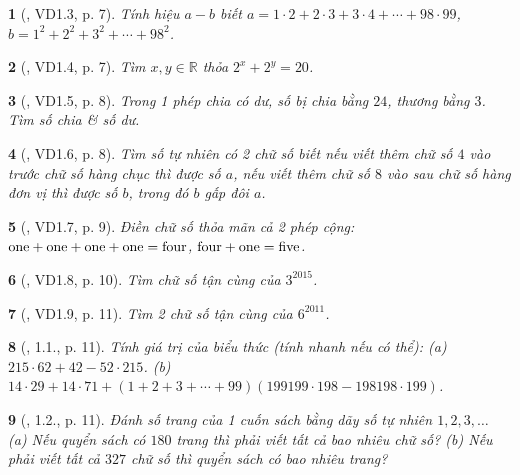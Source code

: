 \documentclass{article}
\newtheorem{baitoan}{}
\begin{document}
\begin{baitoan}[\cite{TLCT_THCS_Toan_6_so_hoc}, VD1.3, p. 7]
	Tính hiệu $a - b$ biết $a = 1\cdot2 + 2\cdot3 + 3\cdot4 + \cdots + 98\cdot99$, $b = 1^2 + 2^2 + 3^2 + \cdots + 98^2$.
\end{baitoan}

\begin{baitoan}[\cite{TLCT_THCS_Toan_6_so_hoc}, VD1.4, p. 7]
	Tìm $x,y\in\mathbb{R}$ thỏa $2^x + 2^y = 20$.
\end{baitoan}

\begin{baitoan}[\cite{TLCT_THCS_Toan_6_so_hoc}, VD1.5, p. 8]
	Trong 1 phép chia có dư, số bị chia bằng $24$, thương bằng $3$. Tìm số chia \& số dư.
\end{baitoan}

\begin{baitoan}[\cite{TLCT_THCS_Toan_6_so_hoc}, VD1.6, p. 8]
	Tìm số tự nhiên có 2 chữ số biết nếu viết thêm chữ số $4$ vào trước chữ số hàng chục thì được số $a$, nếu viết thêm chữ số $8$ vào sau chữ số hàng đơn vị thì được số $b$, trong đó $b$ gấp đôi $a$.
\end{baitoan}

\begin{baitoan}[\cite{TLCT_THCS_Toan_6_so_hoc}, VD1.7, p. 9]
	Điền chữ số thỏa mãn cả 2 phép cộng: $\rm one + one + one + one = four$, $\rm four + one = five$.
\end{baitoan}

\begin{baitoan}[\cite{TLCT_THCS_Toan_6_so_hoc}, VD1.8, p. 10]
	Tìm chữ số tận cùng của $3^{2015}$.
\end{baitoan}

\begin{baitoan}[\cite{TLCT_THCS_Toan_6_so_hoc}, VD1.9, p. 11]
	Tìm 2 chữ số tận cùng của $6^{2011}$.
\end{baitoan}

\begin{baitoan}[\cite{TLCT_THCS_Toan_6_so_hoc}, 1.1., p. 11]
	Tính giá trị của biểu thức (tính nhanh nếu có thể): (a) $215\cdot62 + 42 - 52\cdot215$. (b) $14\cdot29 + 14\cdot71 + (1 + 2 + 3 + \cdots + 99)(199199\cdot198 - 198198\cdot199)$.
\end{baitoan}

\begin{baitoan}[\cite{TLCT_THCS_Toan_6_so_hoc}, 1.2., p. 11]
	Đánh số trang của 1 cuốn sách bằng dãy số tự nhiên $1,2,3,\ldots$ (a) Nếu quyển sách có $180$ trang thì phải viết tất cả bao nhiêu chữ số? (b) Nếu phải viết tất cả $327$ chữ số thì quyển sách có bao nhiêu trang?
\end{baitoan}
\end{document}

